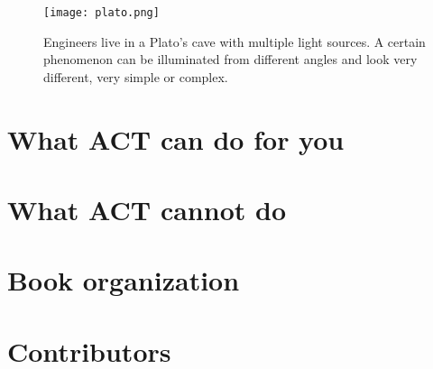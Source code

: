 \begin{figure}[h]
  \centering
  \texttt{[image: plato.png]}
  \caption{
    Engineers live in a Plato's cave with multiple light sources.
    A certain phenomenon can be illuminated from different angles
    and look very different, very simple or complex.
  }
  \label{fig:aspects}
\end{figure}



\section{What ACT can do for you}





\section{What ACT cannot do}



\section{Book organization}



\section{Contributors}

